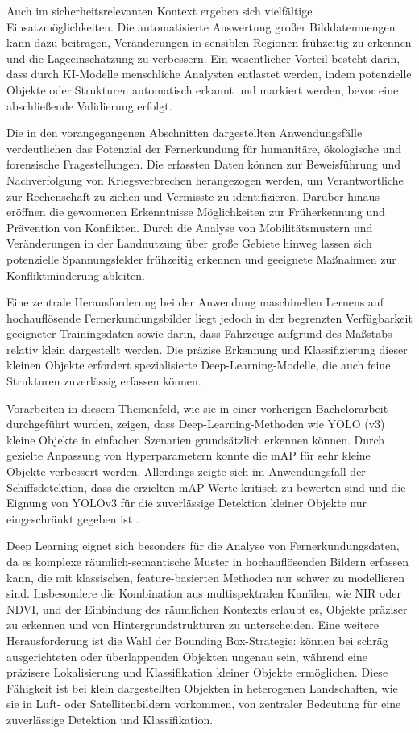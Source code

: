 Auch im sicherheitsrelevanten Kontext ergeben sich vielfältige Einsatzmöglichkeiten. Die automatisierte Auswertung großer Bilddatenmengen kann dazu beitragen, Veränderungen in sensiblen Regionen frühzeitig zu erkennen und die Lageeinschätzung zu verbessern. Ein wesentlicher Vorteil besteht darin, dass durch KI-Modelle menschliche Analysten entlastet werden, indem potenzielle Objekte oder Strukturen automatisch erkannt und markiert werden, bevor eine abschließende Validierung erfolgt.

Die in den vorangegangenen Abschnitten dargestellten Anwendungsfälle verdeutlichen das Potenzial der Fernerkundung für humanitäre, ökologische und forensische Fragestellungen. Die erfassten Daten können zur Beweisführung und Nachverfolgung von Kriegsverbrechen herangezogen werden, um Verantwortliche zur Rechenschaft zu ziehen und Vermisste zu identifizieren. Darüber hinaus eröffnen die gewonnenen Erkenntnisse Möglichkeiten zur Früherkennung und Prävention von Konflikten. Durch die Analyse von Mobilitätsmustern und Veränderungen in der Landnutzung über große Gebiete hinweg lassen sich potenzielle Spannungsfelder frühzeitig erkennen und geeignete Maßnahmen zur Konfliktminderung ableiten.

Eine zentrale Herausforderung bei der Anwendung maschinellen Lernens auf hochauflösende Fernerkundungsbilder liegt jedoch in der begrenzten Verfügbarkeit geeigneter Trainingsdaten sowie darin, dass Fahrzeuge aufgrund des Maßstabs relativ klein dargestellt werden. Die präzise Erkennung und Klassifizierung dieser kleinen Objekte erfordert spezialisierte Deep-Learning-Modelle, die auch feine Strukturen zuverlässig erfassen können.

Vorarbeiten in diesem Themenfeld, wie sie in einer vorherigen Bachelorarbeit \cite{Balzer2022} durchgeführt wurden, zeigen, dass Deep-Learning-Methoden wie \acrfull{YOLO} (v3) kleine Objekte in einfachen Szenarien grundsätzlich erkennen können. Durch gezielte Anpassung von Hyperparametern konnte die \acrfull{mAP} für sehr kleine Objekte verbessert werden. Allerdings zeigte sich im Anwendungsfall der Schiffsdetektion, dass die erzielten mAP-Werte kritisch zu bewerten sind und die Eignung von YOLOv3 für die zuverlässige Detektion kleiner Objekte nur eingeschränkt gegeben ist \cite{Balzer2022}.

Deep Learning eignet sich besonders für die Analyse von Fernerkundungsdaten, da es komplexe räumlich-semantische Muster in hochauflösenden Bildern erfassen kann, die mit klassischen, feature-basierten Methoden nur schwer zu modellieren sind. Insbesondere die Kombination aus multispektralen Kanälen, wie \acrshort{NIR} oder \acrshort{NDVI}, und der Einbindung des räumlichen Kontexts erlaubt es, Objekte präziser zu erkennen und von Hintergrundstrukturen zu unterscheiden. Eine weitere Herausforderung ist die Wahl der Bounding Box-Strategie:  können bei schräg ausgerichteten oder überlappenden Objekten ungenau sein, während  eine präzisere Lokalisierung und Klassifikation kleiner Objekte ermöglichen. Diese Fähigkeit ist bei klein dargestellten Objekten in heterogenen Landschaften, wie sie in Luft- oder Satellitenbildern vorkommen, von zentraler Bedeutung für eine zuverlässige Detektion und Klassifikation.

